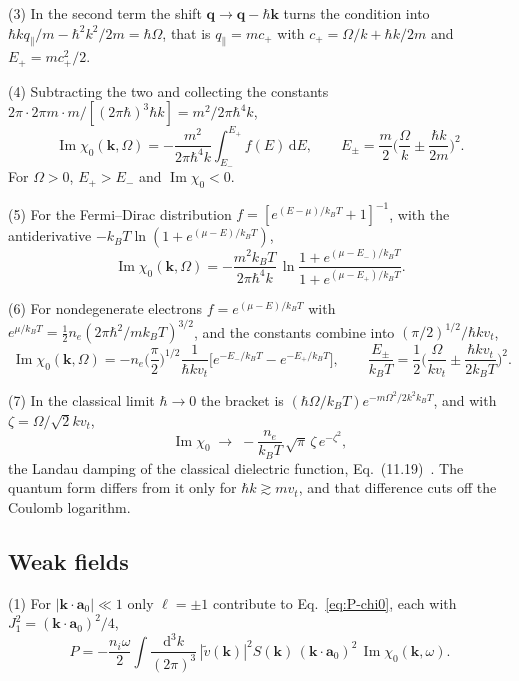 \documentclass[11pt]{article}
\numberwithin{equation}{section}
\newcommand{\av}{\mathbf a_0}
\newcommand{\kv}{\mathbf k}
\newcommand{\dd}{\mathrm d}
\newcommand{\kB}{k_B}
\DeclareMathOperator{\Imag}{Im}
\begin{document}
{\noindent}(3) In the second term the shift $\mathbf q\to\mathbf q-\hbar\kv$
turns the condition into $\hbar kq_\parallel/m-\hbar^2k^2/2m=\hbar\Omega$, that
is $q_\parallel=mc_+$ with $c_+=\Omega/k+\hbar k/2m$ and $E_+=mc_+^2/2$.

{\noindent}(4) Subtracting the two and collecting the constants
$2\pi\cdot2\pi m\cdot m/[(2\pi\hbar)^3\hbar k]=m^2/2\pi\hbar^4k$,
\begin{equation}
\boxed{\;\Imag\chi_0(\kv,\Omega)=-\frac{m^2}{2\pi\hbar^4k}\int_{E_-}^{E_+}f(E)\,\dd E,\qquad
E_\pm=\frac m2\Big(\frac\Omega k\pm\frac{\hbar k}{2m}\Big)^2.\;}
\label{eq:imchi-general}
\end{equation}
For $\Omega>0$, $E_+>E_-$ and $\Imag\chi_0<0$.

{\noindent}(5) For the Fermi--Dirac distribution
$f=[e^{(E-\mu)/\kB T}+1]^{-1}$, with the antiderivative
$-\kB T\ln(1+e^{(\mu-E)/\kB T})$,
\begin{equation}
\boxed{\;\Imag\chi_0(\kv,\Omega)=-\frac{m^2\kB T}{2\pi\hbar^4k}\,
\ln\frac{1+e^{(\mu-E_-)/\kB T}}{1+e^{(\mu-E_+)/\kB T}}.\;}
\label{eq:imchi-fd}
\end{equation}

{\noindent}(6) For nondegenerate electrons $f=e^{(\mu-E)/\kB T}$ with
$e^{\mu/\kB T}=\frac12n_e(2\pi\hbar^2/m\kB T)^{3/2}$, and the constants
combine into $(\pi/2)^{1/2}/\hbar kv_t$,
\begin{equation}
\boxed{\;\Imag\chi_0(\kv,\Omega)=-n_e\Big(\frac\pi2\Big)^{1/2}\frac{1}{\hbar kv_t}
\Big[e^{-E_-/\kB T}-e^{-E_+/\kB T}\Big],\qquad
\frac{E_\pm}{\kB T}=\frac12\Big(\frac{\Omega}{kv_t}\pm\frac{\hbar kv_t}{2\kB T}\Big)^2.\;}
\label{eq:imchi-mb}
\end{equation}

{\noindent}(7) In the classical limit $\hbar\to0$ the bracket is
$(\hbar\Omega/\kB T)e^{-m\Omega^2/2k^2\kB T}$, and with $\zeta=\Omega/\sqrt2kv_t$,
\begin{equation}
\Imag\chi_0\;\longrightarrow\;-\frac{n_e}{\kB T}\,\sqrt\pi\,\zeta\,e^{-\zeta^2},
\label{eq:imchi-classical}
\end{equation}
the Landau damping of the classical dielectric function,
Eq.~(11.19)~\cite{Atzeni2004}. The quantum form differs from it only for
$\hbar k\gtrsim mv_t$, and that difference cuts off the Coulomb logarithm.

\subsection{Weak fields}
{\noindent}(1) For $|\kv\cdot\av|\ll1$ only $\ell=\pm1$ contribute to
Eq.~\eqref{eq:P-chi0}, each with $J_1^2=(\kv\cdot\av)^2/4$,
\begin{equation}
P=-\frac{n_i\omega}{2}\int\frac{\dd^3k}{(2\pi)^3}\,|\tilde v(\kv)|^2S(\kv)\,(\kv\cdot\av)^2\,\Imag\chi_0(\kv,\omega).
\end{equation}
\end{document}

